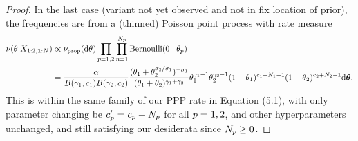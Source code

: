 \begin{proof}
    
    In the last case (variant not yet observed and not in fix location of prior), the frequencies are from a (thinned) Poisson point process with rate measure
    \begin{align*}
        \levync(\vecvariantfreq{}| \pilotdata)&\propto\ratemeasproposed(\de\vecvariantfreq{}) \prod_{\popidx=1,2} \prod_{\unitidx=1}^{\samplesize{\popidx}} \BER(0 \mid \variantfreqperpop{\popidx})\\
        &=\frac{\mass}{B(\corr{1}, \conc{1})B(\corr{2}, \conc{2})}
        \frac{(\variantfreqperpop{1}+\variantfreqperpop{2}^{\rate{2}/\rate{1}})^{-\rate{1}}}{(\variantfreqperpop{1}+\variantfreqperpop{2})^{\corr{1}+\corr{2}}}
        \variantfreqperpop{1}^{\corr{1}-1}\variantfreqperpop{2}^{\corr{2}-1}(1-\variantfreqperpop{1})^{\conc{1}+\samplesize{1}-1}(1-\variantfreqperpop{2})^{\conc{2}+\samplesize{2}-1} \de\btheta.
    \end{align*}
    This is within the same family of our PPP rate in Equation (5.1), with only parameter changing be $c_{p}'=c_{p}+N_{p}$ for all $p=1,2$, and other hyperparameters unchanged, and still satisfying our desiderata since $N_{p}\ge 0$. 
\end{proof}